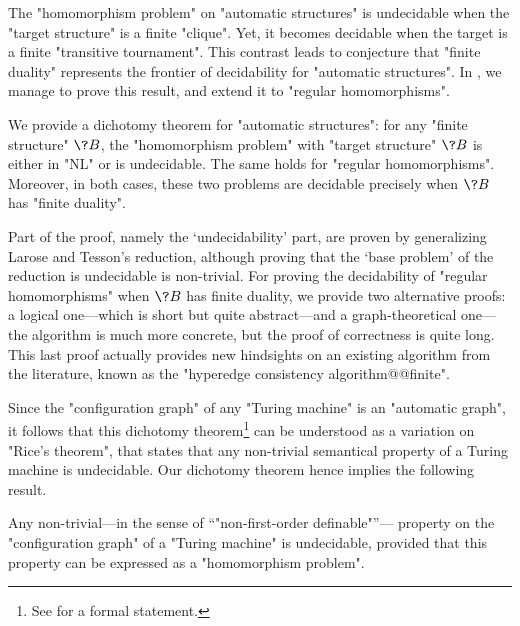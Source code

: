 The "homomorphism problem" on "automatic structures" 
is undecidable when the "target structure" is a finite "clique".
Yet, it becomes decidable when the target is a finite "transitive tournament".
This contrast leads to conjecture that "finite duality" represents the frontier of decidability for "automatic structures". In , we manage to prove this result, and extend it to "regular homomorphisms".

\begin{contribution}
	We provide a dichotomy theorem for "automatic structures":
	for any "finite structure" $\?B$, the "homomorphism problem" with "target structure" $\?B$
	is either in "NL" or is undecidable. The same holds for "regular homomorphisms".
	Moreover, in both cases, these two problems are decidable precisely when $\?B$ has "finite duality".
\end{contribution}

Part of the proof, namely the `undecidability' part, are proven
by generalizing Larose and Tesson's reduction, although proving that the
`base problem' of the reduction is undecidable is non-trivial.
For proving the decidability of "regular homomorphisms" when $\?B$ has finite duality,
we provide two alternative proofs: a logical one---which is short but quite abstract---and
a graph-theoretical one---the algorithm is much more concrete, but the proof of correctness is 
quite long. This last proof actually provides new hindsights on an existing algorithm from the literature, known as the "hyperedge consistency algorithm@@finite".

Since the "configuration graph" of any "Turing machine" is an "automatic graph",
it follows that this dichotomy theorem\footnote{See  for a formal statement.} can be understood
as a variation on "Rice's theorem", that states that any non-trivial
semantical property of a Turing machine is undecidable.
Our dichotomy theorem hence implies the following result.

\begin{contribution}
	Any non-trivial---in the sense of ``"non-first-order definable"''---
	property on the "configuration graph"
	of a "Turing machine" is undecidable, provided that this property can be expressed
	as a "homomorphism problem".
\end{contribution}

